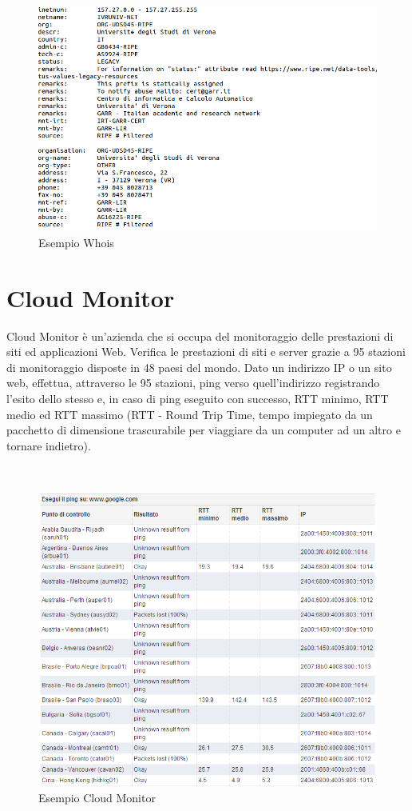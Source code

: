 \documentclass[a4paper,11pt]{book}
\begin{document}
~

\begin{figure}[!ht]
\centering
\includegraphics[scale = 0.6]{Whois.png}
\caption{Esempio Whois}
\end{figure}

\clearpage

\section{Cloud Monitor}
Cloud Monitor \cite{rif9} \`e un'azienda che si occupa del monitoraggio delle prestazioni di siti ed applicazioni Web. Verifica le prestazioni di siti e server grazie a 95 stazioni di monitoraggio disposte in 48 paesi del mondo. 
Dato un indirizzo IP o un sito web, effettua, attraverso le 95 stazioni, ping verso quell'indirizzo registrando l'esito dello stesso e, in caso di ping eseguito con successo, RTT minimo, RTT medio ed RTT massimo (RTT - Round Trip Time, tempo impiegato da un pacchetto di dimensione trascurabile per viaggiare da un computer ad un altro e tornare indietro). 

~

\begin{figure}[!ht]
\centering
\includegraphics[scale = 0.7]{Cloud_Monitor.png}
\caption{Esempio Cloud Monitor}
\end{figure}
\end{document}
